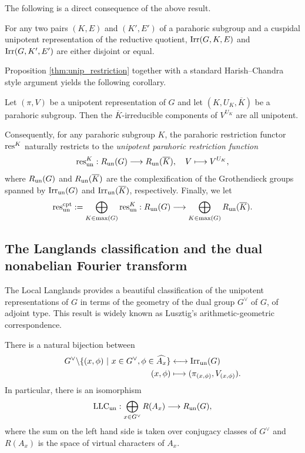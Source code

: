 The following is a direct consequence of the above result.
\begin{cor}\label{cor:unipotentblock_disjoint}
    For any two pairs $(K,E)$ and $(K',E')$ of a parahoric subgroup and a cuspidal unipotent representation of the reductive quotient, $\mathrm{Irr}(G,K,E)$ and $\mathrm{Irr}(G,K',E')$ are either disjoint or equal.
\end{cor}
Proposition \ref{thm:unip_restriction} together with a standard Harish--Chandra style argument yields the following corollary.
\begin{cor}
    Let $(\pi,V)$ be a unipotent representation of $G$ and let $(K,U_K,\overline{K})$ be a parahoric subgroup. Then the $\overline{K}$-irreducible components of $V^{U_K}$ are all unipotent.
\end{cor}

Consequently, for any parahoric subgroup $K$, the parahoric restriction functor $\mathrm{res}^K$ naturally restricts to the \textit{unipotent parahoric restriction function}
\begin{equation*}
    \mathrm{res}^K_{\mathrm{un}}:R_{\mathrm{un}}(G)\longrightarrow R_{\mathrm{un}}(\overline{K}),\quad V\longmapsto V^{U_K},
\end{equation*}
where $R_{\mathrm{un}}(G)$ and $R_{\mathrm{un}}(\overline{K})$ are the complexification of the Grothendieck groups spanned by $\mathrm{Irr}_{\mathrm{un}}(G)$ and $\mathrm{Irr}_{\mathrm{un}}(\overline{K})$, respectively. Finally, we let
$$\mathrm{res}^{\mathrm{cpt}}_{\mathrm{un}}:=\bigoplus_{K\in\max(G)}\mathrm{res}^K_{\mathrm{un}}:R_{\mathrm{un}}(G)\longrightarrow \bigoplus_{K\in\max(G)}R_{\mathrm{un}}(\overline{K}).$$

\subsection{The Langlands classification and the dual nonabelian Fourier transform}\label{subsec:Fourier_transform}

The Local Langlands provides a beautiful classification of the unipotent representations of $G$ in terms of the geometry of the dual group $G^\vee$ of $G$, of adjoint type. This result is widely known as Lusztig's arithmetic-geometric correspondence.
\begin{theorem} There is a natural bijection between
    \begin{align*}
        G^\vee\backslash\{(x,\phi)\ |\ x\in G^\vee,\phi\in\widehat{A_x}\}&\longleftrightarrow \mathrm{Irr}_{\mathrm{un}}(G)\\
        (x,\phi)&\longmapsto (\pi_{(x,\phi)},V_{(x,\phi)}).
    \end{align*}
    In particular, there is an isomorphism
    \begin{equation}\label{eqn:arithmetic-geometric}
        \mathrm{LLC}_{\mathrm{un}}:\bigoplus_{x\in G^\vee}R(A_x)\longrightarrow R_{\mathrm{un}}(G),
    \end{equation}
    where the sum on the left hand side is taken over conjugacy classes of $G^\vee$ and $R(A_x)$ is the space of virtual characters of $A_x$.
\end{theorem}

